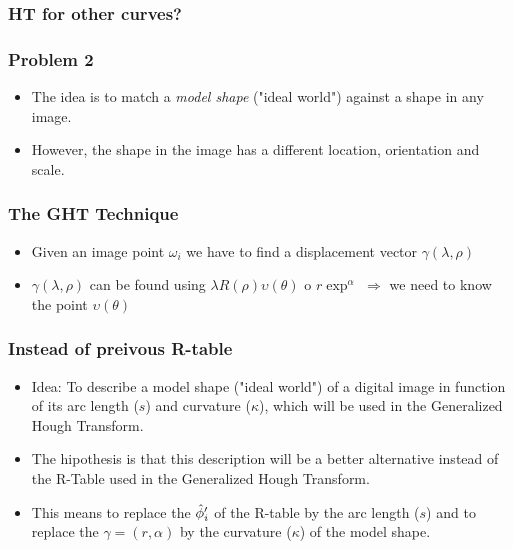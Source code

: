 \documentclass{beamer}
\begin{document}
\begin{frame}
\frametitle{HT for other curves?}

\begin{figure}
\centering
{}
\end{figure}

\end{frame}






\begin{frame}
\frametitle{Problem 2}
\begin{itemize}
\item The idea is to match a \emph{model shape} ("ideal world") against a
shape in any image.
\item However, the shape in the image has a different location, orientation
and scale.
\end{itemize}
\end{frame}


\begin{frame}
  \begin{figure}
  \end{figure}
\end{frame}

\begin{frame}
\frametitle{The GHT Technique}
\begin{figure}
\end{figure}
  \begin{itemize}
  \item Given an image point $\omega_{i}$ we have to find a displacement vector $\gamma(\lambda,\rho)$
  \item $\gamma(\lambda,\rho)$ can be found using
    $\lambda R(\rho)\upsilon(\theta)$ o $r\exp^{\alpha}$ $\Rightarrow$
    we need to know the point $\upsilon(\theta)$
  \end{itemize}
\end{frame}



\begin{frame}
\frametitle{Instead of preivous R-table}
\begin{itemize}
\item Idea: To describe a model shape ("ideal world")
of a digital image in function of its arc length ($s$) and curvature
($\kappa$), which will be used in the Generalized Hough Transform.
\item The hipothesis is that this description will be a better alternative
instead of the R-Table used in the Generalized Hough Transform.
\item This means to replace the $\hat{\phi}\sp{\prime}_{i}$ of the R-table
by the arc length ($s$) and to replace the $\gamma=(r,\alpha)$ by the
curvature ($\kappa$) of the model shape.
 
\end{itemize}
\end{frame}
\end{document}

